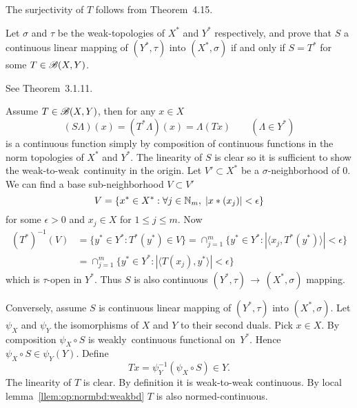 \begin{enumerate}
The surjectivity of $T$ follows from Theorem~4.15.



\begin{excopy}
Let \(\sigma\) and \(\tau\) be the weak\upstar-topologies of \(X^*\) and \(Y^*\)
respectively, and prove that $S$ a
continuous linear mapping of \((Y^*, \tau)\) into \((X^*, \sigma)\)
 if and only if \(S = T^*\) for some \(T \in \mathscr{B}(X,Y)\).
\end{excopy}

See \cite{Megginson1998} Theorem~3.1.11.

Assume \(T \in \mathscr{B}(X,Y)\), then for any \(x \in X\) %
\begin{equation*}
(S \Lambda)(x) = (T^* \Lambda)(x) = \Lambda(T x) \qquad (\Lambda \in Y^*)
\end{equation*}
is a continuous function simply by composition of continuous functions
in the norm topologies of \(X^*\) and \(Y^*\).
The linearity of $S$ is clear so it is sufficient to show 
the weak\upstar-to-weak\upstar\ continuity in the origin.
Let \(V'\subset X^*\) be a \(\sigma\)-neighborhood of $0$.
We can find a base sub-neighborhood \(V \subset V'\)
\begin{equation*}
V = \{x^*\in X^*: \forall j\in\mathbb{N}_m,\; |x*(x_j)| < \epsilon\}
\end{equation*}
for some \(\epsilon > 0\) and \(x_j \in X\) for \(1\leq j \leq m\).
Now
\begin{align*}
(T^*)^{-1}(V)
 &= \{y^*\in Y^*: T^*(y^*) \in V\}
  = \cap_{j=1}^m \{y^*\in Y^*: |\langle x_j, T^*(y^*)\rangle | < \epsilon\} \\
 &= \cap_{j=1}^m \{y^*\in Y^*: |\langle T(x_j), y^*\rangle | < \epsilon\}
\end{align*}
which is \(\tau\)-open in \(Y^*\). Thus $S$ is also
continuous  \((Y^*, \tau) \,\to\, (X^*, \sigma)\) mapping.

Conversely, assume $S$ is
continuous linear mapping of \((Y^*, \tau)\) into \((X^*, \sigma)\).
Let \(\psi_X\) and \(\psi_Y\) the isomorphisms of $X$ and $Y$
to their second duals.
Pick \(x\in X\). By composition \(\psi_X \circ S\) is weakly\upstar\ continuous
functional on~\(Y^*\). Hence \(\psi_X \circ S \in \psi_Y(Y)\).
Define
\begin{equation*}
Tx = \psi_Y^{-1}(\psi_X \circ S) \in Y.
\end{equation*}
The linearity of $T$ is clear. By definition it is weak-to-weak continuous.
By local lemma~\ref{llem:op:normbd:weakbd} $T$ is also normed-continuous.



\end{enumerate}
